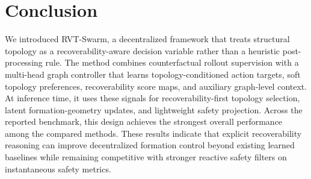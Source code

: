 \documentclass{ieeeaccess}
\begin{document}
\section{Conclusion}
\label{sec:conclusion}

We introduced RVT-Swarm, a decentralized framework that treats
structural topology as a recoverability-aware decision variable rather
than a heuristic post-processing rule. The method combines
counterfactual rollout supervision with a multi-head graph controller
that learns topology-conditioned action targets, soft topology
preferences, recoverability score maps, and auxiliary graph-level
context. At inference time, it uses these signals for
recoverability-first topology selection, latent formation-geometry
updates, and lightweight safety projection. Across the reported
benchmark, this design achieves the strongest overall performance among
the compared methods. These results indicate that explicit
recoverability reasoning can improve decentralized formation control
beyond existing learned baselines while remaining competitive with
stronger reactive safety filters on instantaneous safety metrics.



\end{document}
